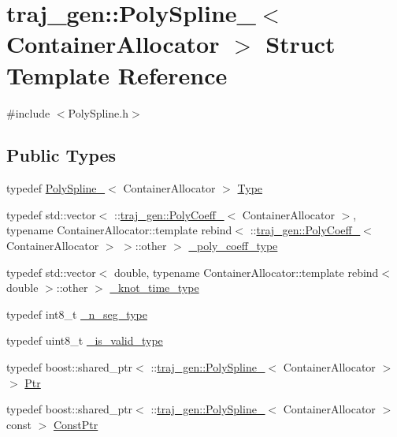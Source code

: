 \hypertarget{structtraj__gen_1_1_poly_spline__}{}\section{traj\+\_\+gen\+:\+:Poly\+Spline\+\_\+$<$ Container\+Allocator $>$ Struct Template Reference}
\label{structtraj__gen_1_1_poly_spline__}


{\ttfamily \#include $<$Poly\+Spline.\+h$>$}

\subsection*{Public Types}
\begin{DoxyCompactItemize}
\item 
typedef \hyperlink{structtraj__gen_1_1_poly_spline__}{Poly\+Spline\+\_\+}$<$ Container\+Allocator $>$ \hyperlink{structtraj__gen_1_1_poly_spline___ada19ce0d660f2092f1a7f25ac770745c}{Type}
\item 
typedef std\+::vector$<$ \+::\hyperlink{structtraj__gen_1_1_poly_coeff__}{traj\+\_\+gen\+::\+Poly\+Coeff\+\_\+}$<$ Container\+Allocator $>$, typename Container\+Allocator\+::template rebind$<$ \+::\hyperlink{structtraj__gen_1_1_poly_coeff__}{traj\+\_\+gen\+::\+Poly\+Coeff\+\_\+}$<$ Container\+Allocator $>$ $>$\+::other $>$ \hyperlink{structtraj__gen_1_1_poly_spline___a023653ddcbaae9497c397e82ffd22217}{\+\_\+poly\+\_\+coeff\+\_\+type}
\item 
typedef std\+::vector$<$ double, typename Container\+Allocator\+::template rebind$<$ double $>$\+::other $>$ \hyperlink{structtraj__gen_1_1_poly_spline___a7826607c170993b6a3846b1d9696c60e}{\+\_\+knot\+\_\+time\+\_\+type}
\item 
typedef int8\+\_\+t \hyperlink{structtraj__gen_1_1_poly_spline___af986120ad67cf19dd0405f94fca0f965}{\+\_\+n\+\_\+seg\+\_\+type}
\item 
typedef uint8\+\_\+t \hyperlink{structtraj__gen_1_1_poly_spline___a0176a14c07afec73c6cc8860ba90af3c}{\+\_\+is\+\_\+valid\+\_\+type}
\item 
typedef boost\+::shared\+\_\+ptr$<$ \+::\hyperlink{structtraj__gen_1_1_poly_spline__}{traj\+\_\+gen\+::\+Poly\+Spline\+\_\+}$<$ Container\+Allocator $>$ $>$ \hyperlink{structtraj__gen_1_1_poly_spline___a1ac7215311b069239e093196ae222586}{Ptr}
\item 
typedef boost\+::shared\+\_\+ptr$<$ \+::\hyperlink{structtraj__gen_1_1_poly_spline__}{traj\+\_\+gen\+::\+Poly\+Spline\+\_\+}$<$ Container\+Allocator $>$ const  $>$ \hyperlink{structtraj__gen_1_1_poly_spline___ad52aa70cb633c91c0052311566e5fe56}{Const\+Ptr}
\end{DoxyCompactItemize}
